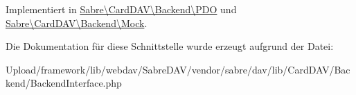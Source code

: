 Implementiert in \mbox{\hyperlink{class_sabre_1_1_card_d_a_v_1_1_backend_1_1_p_d_o_af9221a622af0f1584732f5ed661bdd19}{Sabre\textbackslash{}\+Card\+D\+A\+V\textbackslash{}\+Backend\textbackslash{}\+P\+DO}} und \mbox{\hyperlink{class_sabre_1_1_card_d_a_v_1_1_backend_1_1_mock_ae3df244681bdd69bf887496c2223bace}{Sabre\textbackslash{}\+Card\+D\+A\+V\textbackslash{}\+Backend\textbackslash{}\+Mock}}.



Die Dokumentation für diese Schnittstelle wurde erzeugt aufgrund der Datei\+:\begin{DoxyCompactItemize}
\item 
Upload/framework/lib/webdav/\+Sabre\+D\+A\+V/vendor/sabre/dav/lib/\+Card\+D\+A\+V/\+Backend/Backend\+Interface.\+php\end{DoxyCompactItemize}
